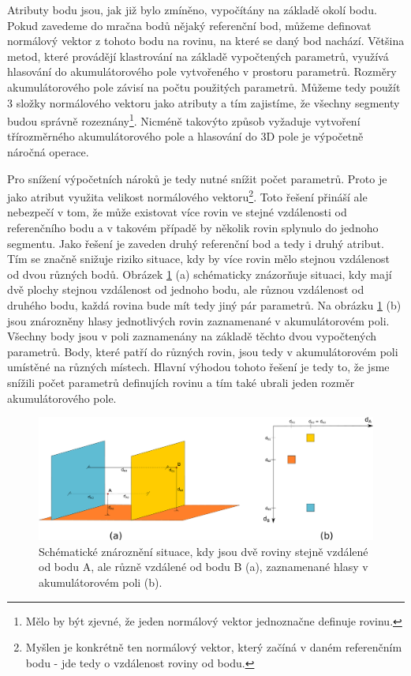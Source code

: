 \documentclass[11pt,twoside,a4paper]{book}
\begin{document}
Atributy bodu jsou, jak již bylo zmíněno, vypočítány na základě okolí bodu. Pokud zavedeme do mračna bodů nějaký referenční bod, můžeme definovat normálový vektor z tohoto bodu na rovinu, na které se daný bod nachází. Většina metod, které provádějí klastrování na základě vypočtených parametrů, využívá hlasování do akumulátorového pole vytvořeného v prostoru parametrů. Rozměry akumulátorového pole závisí na počtu použitých parametrů. Můžeme tedy použít 3 složky normálového vektoru jako atributy a tím zajistíme, že všechny segmenty budou správně rozeznány\footnote{Mělo by být zjevné, že jeden normálový vektor jednoznačne definuje rovinu.}. Nicméně takovýto způsob vyžaduje vytvoření třírozměrného akumulátorového pole a hlasování do 3D pole je výpočetně náročná operace. 

Pro snížení výpočetních nároků je tedy nutné snížit počet parametrů. Proto je jako atribut využita velikost normálového vektoru\footnote{Myšlen je konkrétně ten normálový vektor, který začíná v daném referenčním bodu - jde tedy o vzdálenost roviny od bodu.}. Toto řešení přináší ale nebezpečí v tom, že může existovat více rovin ve stejné vzdálenosti od referenčního bodu a v takovém případě by několik rovin splynulo do jednoho segmentu. Jako řešení je zaveden druhý referenční bod a tedy i druhý atribut. Tím se značně snižuje riziko situace, kdy by více rovin mělo stejnou vzdálenost od dvou různých bodů. Obrázek \ref{fig:normal-def} (a) schématicky znázorňuje situaci, kdy mají dvě plochy stejnou vzdálenost od jednoho bodu, ale různou vzdálenost od druhého bodu, každá rovina bude mít tedy jiný pár parametrů. Na obrázku \ref{fig:normal-def} (b) jsou znározněny hlasy jednotlivých rovin zaznamenané v akumulátorovém poli. Všechny body jsou v poli zaznamenány na základě těchto dvou vypočtených parametrů. Body, které patří do různých rovin, jsou tedy v akumulátorovém poli umístěné na různých místech. Hlavní výhodou tohoto řešení je tedy to, že jsme snížili počet parametrů definujích rovinu a tím také ubrali jeden rozměr akumulátorového pole.

\begin{figure}[ht]
\begin{center}
\includegraphics[width=\textwidth]{figures/definice-normal}
\caption{Schématické znároznění situace, kdy jsou dvě roviny stejně vzdálené od bodu A, ale různě vzdálené od bodu B (a), zaznamenané hlasy v akumulátorovém poli (b).}
\label{fig:normal-def}
\end{center}
\end{figure}
\end{document}
